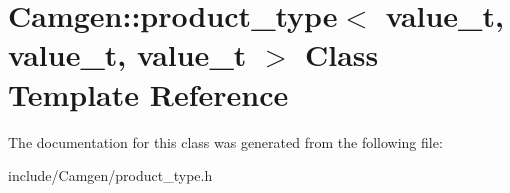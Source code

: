 \hypertarget{a00444}{}\section{Camgen\+:\+:product\+\_\+type$<$ value\+\_\+t, value\+\_\+t, value\+\_\+t $>$ Class Template Reference}
\label{a00444}


The documentation for this class was generated from the following file\+:\begin{DoxyCompactItemize}
\item 
include/\+Camgen/product\+\_\+type.\+h\end{DoxyCompactItemize}
